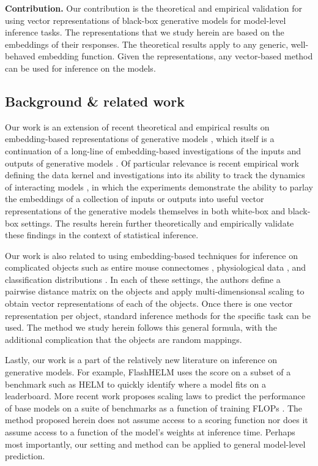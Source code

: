\noindent \textbf{Contribution.} Our contribution is the theoretical and empirical validation for using vector representations of black-box generative models for model-level inference tasks.
The representations that we study herein are based on the embeddings of their responses.
The theoretical results apply to any generic, well-behaved embedding function.
Given the representations, any vector-based method can be used for inference on the models.

\subsection{Background \& related work}

Our work is an extension of recent theoretical and empirical results on embedding-based representations of generative models \citep{aranyak}, which itself is a continuation of a long-line of embedding-based investigations of the inputs and outputs of generative models \citep{mikolov2013efficient, reimers2019sentence, neelakantan2022text, 10098736}. 
Of particular relevance is recent empirical work defining the data kernel \citep{duderstadt2023comparing} and investigations into its ability to track the dynamics of interacting models \citep{helm2024tracking}, in which the experiments demonstrate the ability to parlay the embeddings of a collection of inputs or outputs into useful vector representations of the generative models themselves in both white-box and black-box settings.
The results herein further theoretically and empirically validate these findings in the context of statistical inference.

Our work is also related to using embedding-based techniques for inference on complicated objects such as entire mouse connectomes \citep{WANG2020117274}, physiological data \citep{chen2022mental}, and classification distributions \citep{helm2021inducing}.
In each of these settings, the authors define a pairwise distance matrix on the objects and apply multi-dimensionsal scaling to obtain vector representations of each of the objects.
Once there is one vector representation per object, standard inference methods for the specific task can be used.
The method we study herein follows this general formula, with the additional complication that the objects are random mappings.

Lastly, our work is a part of the relatively new literature on inference on generative models. 
For example, FlashHELM \citep{perlitz2023efficient} uses the score on a subset of a benchmark such as HELM \citep{liang2022holistic} to quickly identify where a model fits on a leaderboard. 
More recent work proposes scaling laws to predict the performance of base models on a suite of benchmarks as a function of training FLOPs \citep{ruan2024observational}. 
The method proposed herein does not assume access to a scoring function nor does it assume access to a function of the model's weights at inference time.
Perhaps most importantly, our setting and method can be applied to general model-level prediction.